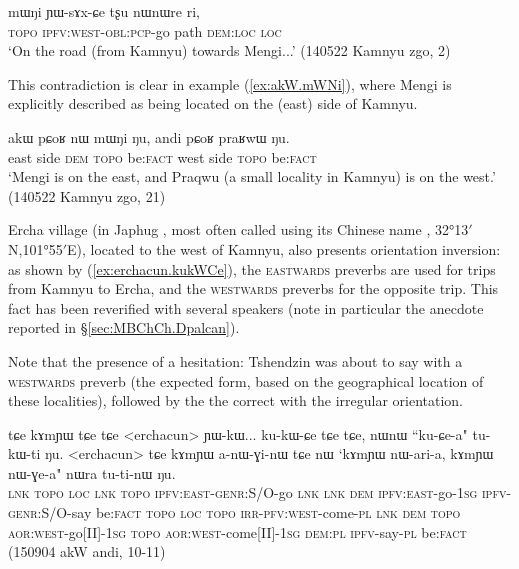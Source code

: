 \begin{exe}
\ex \label{ex:mWNi.YWsAxCe}
\gll mɯŋi ɲɯ-sɤx-ɕe tʂu nɯnɯre ri, \\
\textsc{topo} \textsc{ipfv}:\textsc{west}-\textsc{obl}:\textsc{pcp}-go path \textsc{dem}:\textsc{loc} \textsc{loc} \\
\glt `On the road (from Kamnyu) towards Mengi...' (140522 Kamnyu zgo, 2)
\end{exe}

This contradiction is clear in example (\ref{ex:akW.mWNi}), where Mengi is explicitly described as being located on the  (east) side of Kamnyu.

\begin{exe}
\ex \label{ex:akW.mWNi}
\gll akɯ pɕoʁ nɯ mɯŋi ŋu, andi pɕoʁ praʁwɯ ŋu. \\
 east side \textsc{dem}  \textsc{topo} be:\textsc{fact} west side  \textsc{topo} be:\textsc{fact} \\
\glt `Mengi is on the east, and Praqwu (a small locality in Kamnyu) is on the west.' (140522 Kamnyu zgo, 21)
\end{exe}

Ercha village (in Japhug , most often called using its Chinese name  , 32°13$'$N,101°55$'$E), %
located to the west of Kamnyu, also presents orientation inversion: as shown by (\ref{ex:erchacun.kukWCe}), the \textsc{eastwards} preverbs are used for trips from Kamnyu to Ercha, and the \textsc{westwards} preverbs for the opposite trip. This fact has been reverified with several speakers (note in particular the anecdote reported in §\ref{sec:MBChCh.Dpalcan}).

Note that the presence of a hesitation: Tshendzin was about to say  with a \textsc{westwards} preverb (the expected form, based on the geographical location of these localities), followed by the the correct  with the irregular orientation.

\begin{exe}
\ex \label{ex:erchacun.kukWCe}
\gll tɕe kɤmɲɯ tɕe tɕe <erchacun> ɲɯ-kɯ... ku-kɯ-ɕe tɕe tɕe, nɯnɯ ``ku-ɕe-a" tu-kɯ-ti ŋu. <erchacun> tɕe kɤmɲɯ a-nɯ-ɣi-nɯ tɕe nɯ `kɤmɲɯ nɯ-ari-a, kɤmɲɯ nɯ-ɣe-a" nɯra tu-ti-nɯ ŋu. \\
\textsc{lnk}  \textsc{topo} \textsc{loc} \textsc{lnk}  \textsc{topo} { } \textsc{ipfv}:\textsc{east}-\textsc{genr}:S/O-go \textsc{lnk} \textsc{lnk} \textsc{dem} \textsc{ipfv}:\textsc{east}-go-\textsc{1sg} \textsc{ipfv}-\textsc{genr}:S/O-say be:\textsc{fact}  \textsc{topo} \textsc{loc}  \textsc{topo} \textsc{irr}-\textsc{pfv}:\textsc{west}-come-\textsc{pl} \textsc{lnk} \textsc{dem}  \textsc{topo} \textsc{aor}:\textsc{west}-go[II]-\textsc{1sg}  \textsc{topo} \textsc{aor}:\textsc{west}-come[II]-\textsc{1sg}  \textsc{dem}:\textsc{pl} \textsc{ipfv}-say-\textsc{pl} be:\textsc{fact} \\
\glt (150904 akW andi, 10-11)
\end{exe}

